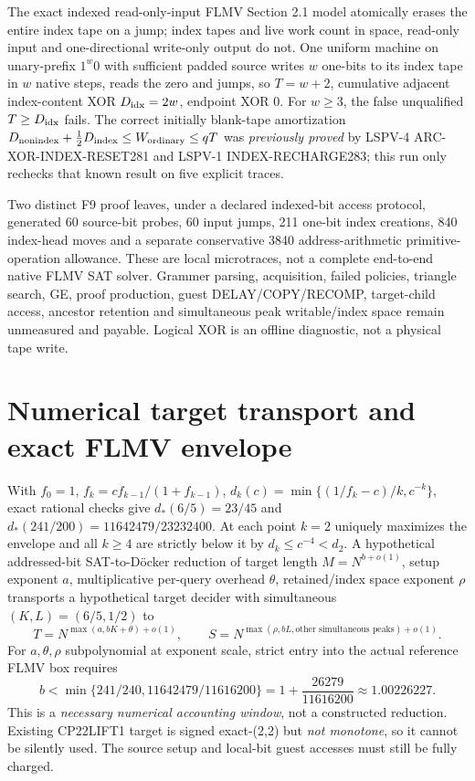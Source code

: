 \documentclass[10pt]{article}
\begin{document}
The exact indexed read-only-input FLMV Section 2.1 model atomically erases the entire index tape on a jump; index tapes and live work count in space, read-only input and one-directional write-only output do not. One uniform machine on unary-prefix $1^w0$ with sufficient padded source writes $w$ one-bits to its index tape in $w$ native steps, reads the zero and jumps, so $T=w+2$, cumulative adjacent index-content XOR $D_{\rm idx}=2w$, endpoint XOR $0$. For $w\ge3$, the false unqualified $T\ge D_{\rm idx}$ fails. The correct initially blank-tape amortization $D_{\rm nonindex}+\frac12D_{\rm index}\le W_{\rm ordinary}\le qT$ was \emph{previously proved} by LSPV-4 ARC-XOR-INDEX-RESET281 and LSPV-1 INDEX-RECHARGE283; this run only rechecks that known result on five explicit traces.

Two distinct F9 proof leaves, under a declared indexed-bit access protocol, generated 60 source-bit probes, 60 input jumps, 211 one-bit index creations, 840 index-head moves and a separate conservative 3840 address-arithmetic primitive-operation allowance. These are local microtraces, not a complete end-to-end native FLMV SAT solver. Grammer parsing, acquisition, failed policies, triangle search, GE, proof production, guest DELAY/COPY/RECOMP, target-child access, ancestor retention and simultaneous peak writable/index space remain unmeasured and payable. Logical XOR is an offline diagnostic, not a physical tape write.

\section{Numerical target transport and exact FLMV envelope}
With $f_0=1$, $f_k=cf_{k-1}/(1+f_{k-1})$, $d_k(c)=\min\{(1/f_k-c)/k,c^{-k}\}$, exact rational checks give $d_*(6/5)=23/45$ and $d_*(241/200)=11642479/23232400$. At each point $k=2$ uniquely maximizes the envelope and all $k\ge4$ are strictly below it by $d_k\le c^{-4}<d_2$. A hypothetical addressed-bit SAT-to-D\"ocker reduction of target length $M=N^{b+o(1)}$, setup exponent $a$, multiplicative per-query overhead $\theta$, retained/index space exponent $\rho$ transports a hypothetical target decider with simultaneous $(K,L)=(6/5,1/2)$ to
\[
T=N^{\max(a,bK+\theta)+o(1)},\qquad
S=N^{\max(\rho,bL,\text{other simultaneous peaks})+o(1)}.
\]
For $a,\theta,\rho$ subpolynomial at exponent scale, strict entry into the actual reference FLMV box requires
\[
b<\min\{241/240,11642479/11616200\}
=1+\frac{26279}{11616200}\approx1.00226227.
\]
This is a \emph{necessary numerical accounting window}, not a constructed reduction. Existing CP22LIFT1 target is signed exact-(2,2) but \emph{not monotone}, so it cannot be silently used. The source setup and local-bit guest accesses must still be fully charged.
\end{document}
